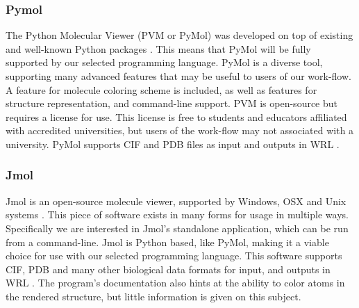 \documentclass[letterpaper, onecolumn, draftclsnofoot, 10pt, compsoc]{IEEEtran}
\begin{document}
                \subsubsection{Pymol}
                        \begin{singlespace}
                        The Python Molecular Viewer (PVM or PyMol) was developed on top of existing and well-known Python packages \cite{pymol}.
                        This means that PyMol will be fully supported by our selected programming language.
                        PyMol is a diverse tool, supporting many advanced features that may be useful to users of our work-flow.
                        A feature for molecule coloring scheme is included, as well as features for structure representation, and command-line support.
                        PVM is open-source but requires a license for use.
                        This license is free to students and educators affiliated with accredited universities, but users of the work-flow may not associated with a university.
                        PyMol supports CIF and PDB files as input and outputs in WRL \cite{pymolFormats}.
                        \end{singlespace}
                \subsubsection{Jmol}
                        \begin{singlespace}
                        Jmol is an open-source molecule viewer, supported by Windows, OSX and Unix systems \cite{jmol}.
                        This piece of software exists in many forms for usage in multiple ways.
                        Specifically we are interested in Jmol's standalone application, which can be run from a command-line.
                        Jmol is Python based, like PyMol, making it a viable choice for use with our selected programming language.
                        This software supports CIF, PDB and many other biological data formats for input, and outputs in WRL \cite{jmolIn,jmolOut}.
                        The program's documentation also hints at the ability to color atoms in the rendered structure, but little information is given on this subject.
                        \end{singlespace}
\end{document}
